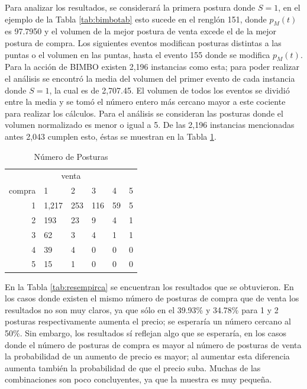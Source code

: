 \documentclass[11pt]{article}
\numberwithin{equation}{section} %
\begin{document}
Para analizar los resultados, se considerará la primera postura donde $S=1$, en el ejemplo de la Tabla \ref{tab:bimbotab} esto sucede en el renglón 151, donde $p_M(t)$ es 97.7950 y el volumen de la mejor postura de venta excede el de la mejor postura de compra. Los siguientes eventos modifican posturas distintas a las puntas o el volumen en las puntas, hasta el evento 155 donde se modifica $p_M(t)$.\\

Para la acción de BIMBO existen 2,196 instancias como esta; para poder realizar el análisis se encontró la media del volumen del primer evento de cada instancia donde $S=1$, la cual es de 2,707.45. El volumen de todos los eventos se dividió entre la media y se tomó el número entero más cercano mayor a este cociente para realizar los cálculos. Para el análisis se consideran las posturas donde el volumen normalizado es menor o igual a 5. De las 2,196 instancias mencionadas antes 2,043 cumplen esto, éstas se muestran en la Tabla \ref{tab:numempirca}.

\begin{table}[htbp]
\centering
\caption{Número de Posturas}
\begin{tabular}{r|p{1.5cm}|p{1.5cm}|p{1.5cm}|p{1.5cm}|p{1.5cm}|}
\multicolumn{6}{c}{venta}\\
\cline{2-6}
compra & 1& 2 & 3 & 4 & 5 \\
\cline{2-6}
1 & 1,217 & 253 & 116 & 59 & 5 \\
2 & 193 & 23 & 9 & 4 & 1 \\
3 & 62 & 3 & 4 & 1 & 1 \\
4 & 39 & 4 & 0 & 0 & 0 \\
5 & 15 & 1 & 0 & 0 & 0 \\
\cline{2-6}
\end{tabular}%
\label{tab:numempirca}%
\end{table}%

En la Tabla \ref{tab:resempirca} se encuentran los resultados que se obtuvieron. En los casos donde existen el mismo número de posturas de compra que de venta los resultados no son muy claros, ya que sólo en el 39.93\% y 34.78\% para 1 y 2 posturas respectivamente aumenta el precio; se esperaría un número cercano al 50\%. Sin embargo, los resultados sí reflejan algo que se esperaría, en los casos donde el número de posturas de compra es mayor al número de posturas de venta la probabilidad de un aumento de precio es mayor; al aumentar esta diferencia aumenta también la probabilidad de que el precio suba. Muchas de las combinaciones son poco concluyentes, ya que la muestra es muy pequeña.
\end{document}
